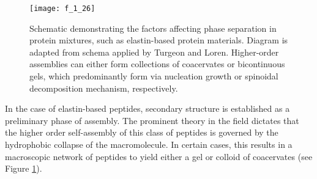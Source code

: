 \begin{refsection}
\begin{figure}[h!] \centering \texttt{[image: f\_1\_26]}
    \caption[Schematic demonstrating the factors affecting phase separation in
        protein mixtures, such as elastin-based protein materials. Diagram is
        adapted from schema applied by Turgeon and Loren. Higher-order
        assemblies can either form collections of coacervates or bicontinuous
        gels, which predominantly form via nucleation growth or spinoidal
    decomposition mechanism, respectively.]
{Schematic demonstrating the factors affecting phase separation in protein
    mixtures, such as elastin-based protein materials. Diagram is adapted from
    schema applied by Turgeon and Loren.\cite{Loren2003,Turgeon2003}
    Higher-order assemblies can either form collections of coacervates or
    bicontinuous gels, which predominantly form via nucleation growth or
    spinoidal decomposition mechanism, respectively.\cite{Maugey2001}} 
\label{fig:gelation_model} \end{figure}
In the case of elastin-based peptides, secondary structure is established as a
preliminary phase of assembly. The prominent theory in the field dictates that
the higher order self-assembly of this class of peptides is governed by the
hydrophobic collapse of the macromolecule. In certain cases, this results in a
macroscopic network of peptides to yield either a gel or colloid of
coacervates (see Figure \ref{fig:gelation_model}).\cite{Urry1991,Li2002a,Li2001,Urry1986,Urry1988}


\end{refsection}
